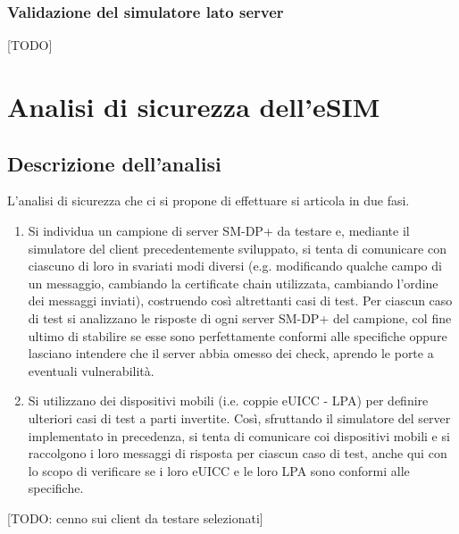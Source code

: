 \documentclass[10pt, oneside]{book}
\begin{document}
\subsection{Validazione del simulatore lato server}
[TODO]

\chapter{Analisi di sicurezza dell'eSIM}
\section{Descrizione dell'analisi}
L'analisi di sicurezza che ci si propone di effettuare si articola in due fasi.
\begin{enumerate}
\item Si individua un campione di server SM-DP+ da testare e, mediante il simulatore del client precedentemente sviluppato, si tenta di comunicare con ciascuno di loro in svariati modi diversi (e.g. modificando qualche campo di un messaggio, cambiando la certificate chain utilizzata, cambiando l'ordine dei messaggi inviati), costruendo così altrettanti casi di test. Per ciascun caso di test si analizzano le risposte di ogni server SM-DP+ del campione, col fine ultimo di stabilire se esse sono perfettamente conformi alle specifiche oppure lasciano intendere che il server abbia omesso dei check, aprendo le porte a eventuali vulnerabilità.
\item Si utilizzano dei dispositivi mobili (i.e. coppie eUICC - LPA) per definire ulteriori casi di test a parti invertite. Così, sfruttando il simulatore del server implementato in precedenza, si tenta di comunicare coi dispositivi mobili e si raccolgono i loro messaggi di risposta per ciascun caso di test, anche qui con lo scopo di verificare se i loro eUICC e le loro LPA sono conformi alle specifiche.
\end{enumerate}

[TODO: cenno sui client da testare selezionati]
\end{document}
